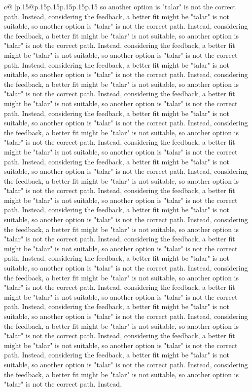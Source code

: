 \documentclass{article}
\begin{document}
{\begin{supertabular}{c@{$\;$}|p{.15\linewidth}@{}p{.15\linewidth}p{.15\linewidth}p{.15\linewidth}p{.15\linewidth}p{.15\linewidth}}
{{{so another option is "talar" is not the correct path. Instead, considering the feedback, a better fit might be "talar" is not suitable, so another option is "talar" is not the correct path. Instead, considering the feedback, a better fit might be "talar" is not suitable, so another option is "talar" is not the correct path. Instead, considering the feedback, a better fit might be "talar" is not suitable, so another option is "talar" is not the correct path. Instead, considering the feedback, a better fit might be "talar" is not suitable, so another option is "talar" is not the correct path. Instead, considering the feedback, a better fit might be "talar" is not suitable, so another option is "talar" is not the correct path. Instead, considering the feedback, a better fit might be "talar" is not suitable, so another option is "talar" is not the correct path. Instead, considering the feedback, a better fit might be "talar" is not suitable, so another option is "talar" is not the correct path. Instead, considering the feedback, a better fit might be "talar" is not suitable, so another option is "talar" is not the correct path. Instead, considering the feedback, a better fit might be "talar" is not suitable, so another option is "talar" is not the correct path. Instead, considering the feedback, a better fit might be "talar" is not suitable, so another option is "talar" is not the correct path. Instead, considering the feedback, a better fit might be "talar" is not suitable, so another option is "talar" is not the correct path. Instead, considering the feedback, a better fit might be "talar" is not suitable, so another option is "talar" is not the correct path. Instead, considering the feedback, a better fit might be "talar" is not suitable, so another option is "talar" is not the correct path. Instead, considering the feedback, a better fit might be "talar" is not suitable, so another option is "talar" is not the correct path. Instead, considering the feedback, a better fit might be "talar" is not suitable, so another option is "talar" is not the correct path. Instead, considering the feedback, a better fit might be "talar" is not suitable, so another option is "talar" is not the correct path. Instead, considering the feedback, a better fit might be "talar" is not suitable, so another option is "talar" is not the correct path. Instead, considering the feedback, a better fit might be "talar" is not suitable, so another option is "talar" is not the correct path. Instead, considering the feedback, a better fit might be "talar" is not suitable, so another option is "talar" is not the correct path. Instead, considering the feedback, a better fit might be "talar" is not suitable, so another option is "talar" is not the correct path. Instead, considering the feedback, a better fit might be "talar" is not suitable, so another option is "talar" is not the correct path. Instead, considering the feedback, a better fit might be "talar" is not suitable, so another option is "talar" is not the correct path. Instead, considering the feedback, a better fit might be "talar" is not suitable, so another option is "talar" is not the correct path. Instead, }}}
\end{supertabular}}
\end{document}
